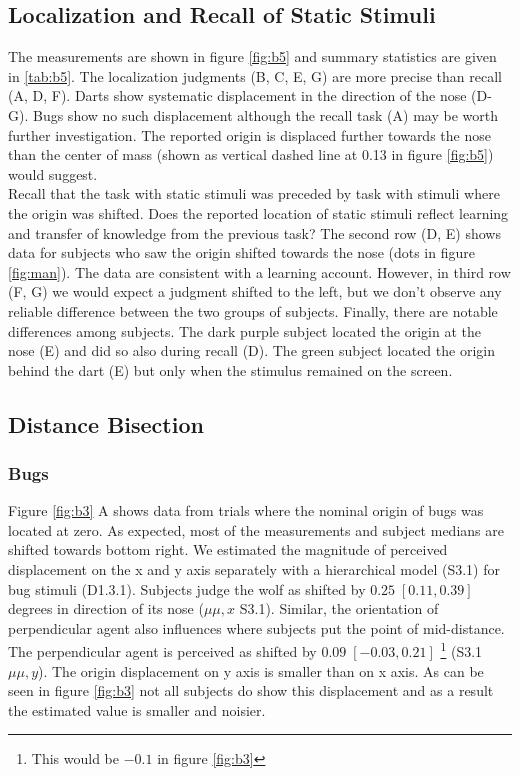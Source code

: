 \documentclass[10pt]{article}
\begin{document}
\subsection*{Localization and Recall of Static Stimuli}

The measurements are shown in figure \ref{fig:b5} and summary statistics are given in \ref{tab:b5}. 
The localization judgments (B, C, E, G) are more precise than recall (A, D, F). 
Darts show systematic displacement in the direction of the nose (D-G). 
Bugs show no such displacement although the recall task (A) may be worth further investigation. 
The reported origin is displaced further towards the nose than the center of mass (shown as vertical dashed line at 0.13 in figure \ref{fig:b5}) would suggest. \\
Recall that the task with static stimuli was preceded by task with stimuli where the origin was shifted. 
Does the reported location of static stimuli reflect learning and transfer of knowledge from the previous task? 
The second row (D, E) shows data for subjects who saw the origin shifted towards the nose (dots in figure \ref{fig:man}). 
The data are consistent with a learning account. 
However, in third row (F, G) we would expect a judgment shifted to the left, but we don't observe any reliable difference between the two groups of subjects. 
Finally, there are notable differences among subjects. 
The dark purple subject located the origin at the nose (E) and did so also during recall (D). 
The green subject located the origin behind the dart (E) but only when the stimulus remained on the screen. 

\subsection*{Distance Bisection}
\subsubsection*{Bugs}
Figure \ref{fig:b3} A shows data from trials where the nominal origin of bugs was located at zero. 
As expected, most of the measurements and subject medians are shifted towards bottom right.
We estimated the magnitude of perceived displacement on the x and y axis separately with a hierarchical model (S3.1) for bug stimuli (D1.3.1). Subjects judge the wolf as shifted by $0.25 \; [0.11,0.39]$ degrees in direction of its nose ($\mu{\mu,x}$ S3.1). %
Similar, the orientation of perpendicular agent also influences where subjects put the point of mid-distance. 
The perpendicular agent is perceived as shifted by $0.09\; [-0.03,0.21]$ \footnote{This would be $-0.1$ in figure \ref{fig:b3}} (S3.1 $\mu{\mu,y}$). 
The origin displacement on y axis is smaller than on x axis. 
As can be seen in figure \ref{fig:b3} not all subjects do show this displacement and as a result the estimated value is smaller and noisier.\\
\end{document}
